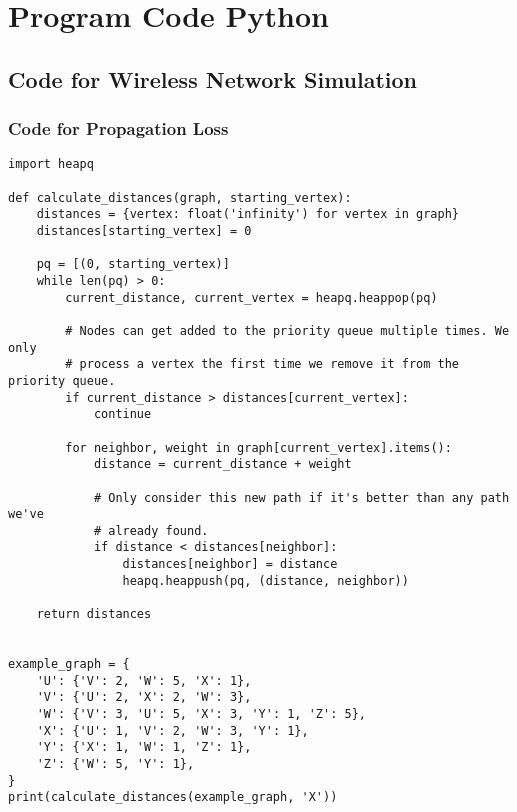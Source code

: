 \chapter{Program Code Python} 

\section*{Code for Wireless Network Simulation}

\subsection*{Code for Propagation Loss}
\begin{verbatim}
import heapq

def calculate_distances(graph, starting_vertex):
    distances = {vertex: float('infinity') for vertex in graph}
    distances[starting_vertex] = 0

    pq = [(0, starting_vertex)]
    while len(pq) > 0:
        current_distance, current_vertex = heapq.heappop(pq)

        # Nodes can get added to the priority queue multiple times. We only
        # process a vertex the first time we remove it from the priority queue.
        if current_distance > distances[current_vertex]:
            continue

        for neighbor, weight in graph[current_vertex].items():
            distance = current_distance + weight

            # Only consider this new path if it's better than any path we've
            # already found.
            if distance < distances[neighbor]:
                distances[neighbor] = distance
                heapq.heappush(pq, (distance, neighbor))

    return distances


example_graph = {
    'U': {'V': 2, 'W': 5, 'X': 1},
    'V': {'U': 2, 'X': 2, 'W': 3},
    'W': {'V': 3, 'U': 5, 'X': 3, 'Y': 1, 'Z': 5},
    'X': {'U': 1, 'V': 2, 'W': 3, 'Y': 1},
    'Y': {'X': 1, 'W': 1, 'Z': 1},
    'Z': {'W': 5, 'Y': 1},
}
print(calculate_distances(example_graph, 'X'))

\end{verbatim}